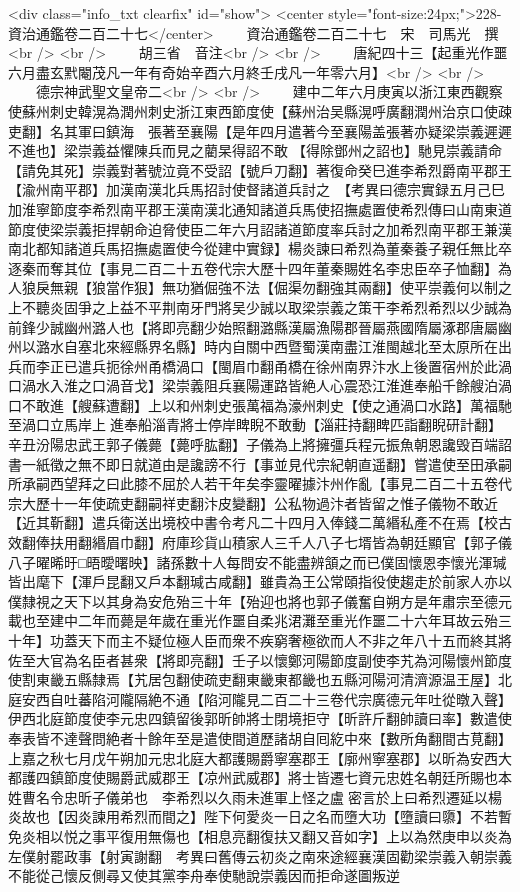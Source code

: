 <div class="info_txt clearfix" id="show">
<center style="font-size:24px;">228-資治通鑑卷二百二十七</center>
  　　資治通鑑卷二百二十七　宋　司馬光　撰<br />
<br />
　　胡三省　音注<br />
<br />
　　唐紀四十三【起重光作噩六月盡玄黓閹茂凡一年有奇始辛酉六月終壬戌凡一年零六月】<br />
<br />
　　德宗神武聖文皇帝二<br />
<br />
　　建中二年六月庚寅以浙江東西觀察使蘇州刺史韓滉為潤州刺史浙江東西節度使【蘇州治吴縣滉呼廣翻潤州治京口使疎吏翻】名其軍曰鎮海　張著至襄陽【是年四月遣著今至襄陽盖張著亦疑梁崇義遲遲不進也】梁崇義益懼陳兵而見之藺杲得詔不敢【得除鄧州之詔也】馳見崇義請命【請免其死】崇義對著號泣竟不受詔【號戶刀翻】著復命癸巳進李希烈爵南平郡王【渝州南平郡】加漢南漢北兵馬招討使督諸道兵討之　【考異曰德宗實録五月己巳加淮寧節度李希烈南平郡王漢南漢北通知諸道兵馬使招撫處置使希烈傳曰山南東道節度使梁崇義拒捍朝命迫脅使臣二年六月詔諸道節度率兵討之加希烈南平郡王兼漢南北都知諸道兵馬招撫處置使今從建中實録】楊炎諫曰希烈為董秦養子親任無比卒逐秦而奪其位【事見二百二十五卷代宗大歷十四年董秦賜姓名李忠臣卒子恤翻】為人狼戾無親【狼當作狠】無功猶倔強不法【倔渠勿翻強其兩翻】使平崇義何以制之上不聽炎固爭之上益不平荆南牙門將吴少誠以取梁崇義之策干李希烈希烈以少誠為前鋒少誠幽州潞人也【將即亮翻少始照翻潞縣漢屬漁陽郡晉屬燕國隋屬涿郡唐屬幽州以潞水自塞北來經縣界名縣】時内自關中西暨蜀漢南盡江淮閩越北至太原所在出兵而李正已遣兵扼徐州甬橋渦口【閩眉巾翻甬橋在徐州南界汴水上後置宿州於此渦口渦水入淮之口渦音戈】梁崇義阻兵襄陽運路皆絶人心震恐江淮進奉船千餘艘泊渦口不敢進【艘蘇遭翻】上以和州刺史張萬福為濠州刺史【使之通渦口水路】萬福馳至渦口立馬岸上進奉船淄青將士停岸睥睨不敢動【淄莊持翻睥匹詣翻睨研計翻】　辛丑汾陽忠武王郭子儀薨【薨呼肱翻】子儀為上將擁彊兵程元振魚朝恩讒毁百端詔書一紙徵之無不即日就道由是讒謗不行【事並見代宗紀朝直遥翻】嘗遣使至田承嗣所承嗣西望拜之曰此膝不屈於人若干年矣李靈曜據汴州作亂【事見二百二十五卷代宗大歷十一年使疏吏翻嗣祥吏翻汴皮變翻】公私物過汴者皆留之惟子儀物不敢近【近其靳翻】遣兵衛送出境校中書令考凡二十四月入俸錢二萬緡私產不在焉【校古效翻俸扶用翻緡眉巾翻】府庫珍貨山積家人三千人八子七壻皆為朝廷顯官【郭子儀八子曜晞旴□晤曖曙映】諸孫數十人每問安不能盡辨頷之而已僕固懷恩李懷光渾瑊皆出麾下【渾戶昆翻又戶本翻瑊古咸翻】雖貴為王公常頤指役使趨走於前家人亦以僕隸視之天下以其身為安危殆三十年【殆迎也將也郭子儀奮自朔方是年肅宗至德元載也至建中二年而薨是年歲在重光作噩自柔兆涒灘至重光作噩二十六年耳故云殆三十年】功蓋天下而主不疑位極人臣而衆不疾窮奢極欲而人不非之年八十五而終其將佐至大官為名臣者甚衆【將即亮翻】壬子以懷鄭河陽節度副使李艽為河陽懷州節度使割東畿五縣隸焉【艽居包翻使疏吏翻東畿東都畿也五縣河陽河清濟源温王屋】北庭安西自吐蕃陷河隴隔絶不通【陷河隴見二百二十三卷代宗廣德元年吐從暾入聲】伊西北庭節度使李元忠四鎮留後郭昕帥將士閉境拒守【昕許斤翻帥讀曰率】數遣使奉表皆不達聲問絶者十餘年至是遣使間道歷諸胡自囘紇中來【數所角翻間古莧翻】上嘉之秋七月戊午朔加元忠北庭大都護賜爵寧塞郡王【廓州寧塞郡】以昕為安西大都護四鎮節度使賜爵武威郡王【凉州武威郡】將士皆遷七資元忠姓名朝廷所賜也本姓曹名令忠昕子儀弟也　李希烈以久雨未進軍上怪之盧密言於上曰希烈遷延以楊炎故也【因炎諫用希烈而間之】陛下何愛炎一日之名而墮大功【墮讀曰隳】不若暫免炎相以悦之事平復用無傷也【相息亮翻復扶又翻又音如字】上以為然庚申以炎為左僕射罷政事【射寅謝翻　考異曰舊傳云初炎之南來途經襄漢固勸梁崇義入朝崇義不能從己懷反側尋又使其黨李舟奉使馳說崇義因而拒命遂圖叛逆